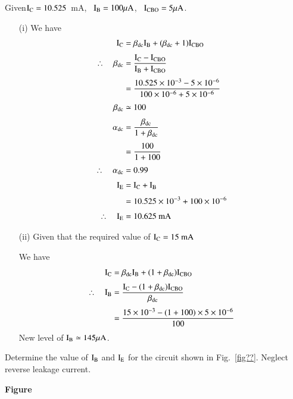\begin{solution}
Given\quad $\textrm{I}_{\textrm{C}}=10.525$~mA, \ $\textrm{I}_{\textrm{B}}=100\mu\textrm{A}$, \ $\textrm{I}_{\text{CBO}}=5\mu\textrm{A}$.
\begin{itemize}
\item[(i)] We have
\begin{align*}
\textrm{I}_{\textrm{C}} &= \beta_{\text{dc}}\textrm{I}_{\textrm{B}}+(\beta_{\text{dc}}+1)\textrm{I}_{\text{CBO}}\\[3pt]
\therefore\quad \beta_{\text{dc}} &= \frac{\textrm{I}_{\textrm{C}}-\textrm{I}_{\text{CBO}}}{\textrm{I}_{\textrm{B}}+\textrm{I}_{\text{CBO}}}\\[3pt]
&= \frac{10.525\times 10^{-3}-5\times 10^{-6}}{100\times 10^{-6}+5\times 10^{-6}}\\[3pt]
\beta_{\text{dc}} &\simeq 100\\[3pt]
\alpha_{\text{dc}} &= \frac{\beta_{\text{dc}}}{1+\beta_{\text{dc}}}\\[3pt]
&= \frac{100}{1+100}\\[3pt]
\therefore\quad \alpha_{\text{dc}} &= 0.99\\[3pt]
\textrm{I}_{\textrm{E}} &= \textrm{I}_{\textrm{C}}+\textrm{I}_{\textrm{B}}\\[3pt]
&= 10.525\times 10^{-3}+100\times 10^{-6}\\[3pt]
\therefore\quad \textrm{I}_{\textrm{E}} &= 10.625\text{~mA}
\end{align*}

\item[(ii)] Given that the required value of $\textrm{I}_{\textrm{C}}=15\text{~mA}$

We have 
\begin{align*}
\textrm{I}_{\textrm{C}} &= \beta_{\text{dc}}\textrm{I}_{\textrm{B}}+(1+\beta_{\text{dc}})\textrm{I}_{\text{CBO}}\\[3pt]
\therefore\quad \textrm{I}_{\textrm{B}} &= \frac{\textrm{I}_{\textrm{C}}-(1+\beta_{\text{dc}})\textrm{I}_{\text{CBO}}}{\beta_{\text{dc}}}\\[3pt]
&= \frac{15\times 10^{-3}-(1+100)\times 5\times 10^{-6}}{100}
\end{align*}
New level of $\textrm{I}_{\textrm{B}}\simeq 145\mu\textrm{A}$.
\end{itemize}
\end{solution}

\begin{problem}\label{prob2.10}
Determine the value of $\textrm{I}_{\textrm{B}}$ and $\textrm{I}_{\textrm{E}}$ for the circuit shown in Fig.~\ref{fig??}. Neglect reverse leakage current.
\begin{center}
{\bf Figure}
\end{center}
\end{problem}

